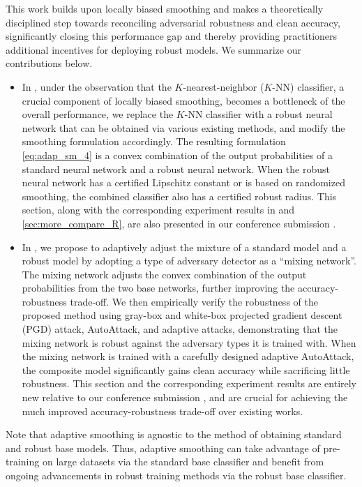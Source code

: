 \documentclass[11pt, letterpaper]{article}
\theoremstyle{plain}
\theoremstyle{definition}
\begin{document}
This work builds upon locally biased smoothing \citep{Anderson21b} and makes a theoretically disciplined step towards reconciling adversarial robustness and clean accuracy, significantly closing this performance gap and thereby providing practitioners additional incentives for deploying robust models. We summarize our contributions below.
\begin{itemize}[leftmargin=6mm]
	\setlength\itemsep{1pt}
	\item In , under the observation that the $K$-nearest-neighbor ($K$-NN) classifier, a crucial component of locally biased smoothing, becomes a bottleneck of the overall performance, we replace the $K$-NN classifier with a robust neural network that can be obtained via various existing methods, and modify the smoothing formulation accordingly. The resulting formulation \cref{eq:adap_sm_4} is a convex combination of the output probabilities of a standard neural network and a robust neural network. When the robust neural network has a certified Lipschitz constant or is based on randomized smoothing, the combined classifier also has a certified robust radius. This section, along with the corresponding experiment results in  and \ref{sec:more_compare_R}, are also presented in our conference submission \citep{Bai23a}.
	\item In , we propose to adaptively adjust the mixture of a standard model and a robust model by adopting a type of adversary detector as a ``mixing network''. The mixing network adjusts the convex combination of the output probabilities from the two base networks, further improving the accuracy-robustness trade-off. We then empirically verify the robustness of the proposed method using gray-box and white-box projected gradient descent (PGD) attack, AutoAttack, and adaptive attacks, demonstrating that the mixing network is robust against the adversary types it is trained with. When the mixing network is trained with a carefully designed adaptive AutoAttack, the composite model significantly gains clean accuracy while sacrificing little robustness. This section and the corresponding experiment results are entirely new relative to our conference submission \citep{Bai23a}, and are crucial for achieving the much improved accuracy-robustness trade-off over existing works.
\end{itemize}

Note that adaptive smoothing is agnostic to the method of obtaining standard and robust base models. Thus, adaptive smoothing can take advantage of pre-training on large datasets via the standard base classifier and benefit from ongoing advancements in robust training methods via the robust base classifier.
\end{document}
